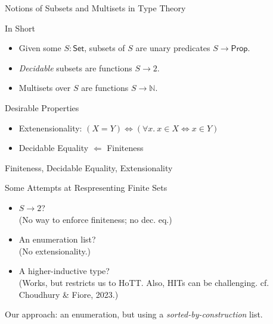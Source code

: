 \documentclass{beamer}
\begin{document}
\begin{frame}{Notions of Subsets and Multisets in Type Theory}
\begin{block}{In Short}
\begin{itemize}
  \item Given some $S : \mathsf{Set}$, subsets of $S$ are unary predicates $S \to \mathsf{Prop}$.
  \item \emph{Decidable} subsets are functions $S \to 2$.
  \item Multisets over $S$ are functions $S \to \mathbb{N}$.
\end{itemize}
\end{block}
\pause

\begin{block}{Desirable Properties}
\begin{itemize}
  \item Extenensionality: \pause $(X = Y) \iff (\forall x.~x \in X \iff x \in Y)$
  \item Decidable Equality \pause $\Leftarrow$ Finiteness
\end{itemize}
\end{block}
\end{frame}

\begin{frame}{Finiteness, Decidable Equality, Extensionality}
\begin{block}{Some Attempts at Respresenting Finite Sets}
\begin{itemize}
  \item  $S \to 2$? \\
        (No way to enforce finiteness; no dec. eq.)
  \item An enumeration list? \\
        (No extensionality.)
  \item A higher-inductive type? \\
        (Works, but restricts us to HoTT. Also, HITs can be challenging. cf. Choudhury \& Fiore, 2023.)
\end{itemize}

\end{block}


\begin{center}
Our approach: an enumeration, but using a \emph{sorted-by-construction} list.
\end{center}
\end{frame}
\end{document}

